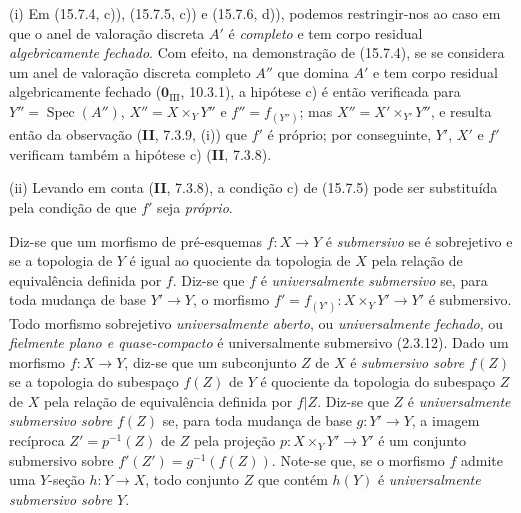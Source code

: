 \begin{remarks}[15.7.7]
\label{IV.15.7.7}
(i) Em (15.7.4, c)), (15.7.5, c)) e (15.7.6, d)), podemos restringir-nos ao caso em que o anel de valoração discreta $A'$ é \emph{completo} e tem corpo residual \emph{algebricamente fechado}. Com efeito, na demonstração de (15.7.4), se se considera um anel de valoração discreta completo $A''$ que domina $A'$ e tem corpo residual algebricamente fechado ($\mathbf{0}_{\mathrm{III}}$, 10.3.1), a hipótese c) é então verificada para $Y''=\operatorname{Spec}(A'')$, $X''=X\times_Y Y''$ e $f''=f_{(Y'')}$; mas $X''=X'\times_{Y'}Y''$, e resulta então da observação (\textbf{II}, 7.3.9, (i)) que $f'$ é próprio; por conseguinte, $Y'$, $X'$ e $f'$ verificam também a hipótese c) (\textbf{II}, 7.3.8).

(ii) Levando em conta (\textbf{II}, 7.3.8), a condição c) de (15.7.5) pode ser substituída pela condição de que $f'$ seja \emph{próprio}.
\end{remarks}

\begin{env}[15.7.8]
\label{IV.15.7.8}
Diz-se que um morfismo de pré-esquemas $f:X\to Y$ é \emph{submersivo} se é sobrejetivo e se a topologia de $Y$ é igual ao quociente da topologia de $X$ pela relação de equivalência definida por $f$. Diz-se que $f$ é \emph{universalmente submersivo} se, para toda mudança de base $Y'\to Y$, o morfismo $f'=f_{(Y')}:X\times_Y Y'\to Y'$ é submersivo. Todo morfismo sobrejetivo \emph{universalmente aberto}, ou \emph{universalmente fechado}, ou \emph{fielmente plano e quase-compacto} é universalmente submersivo (2.3.12). Dado um morfismo $f:X\to Y$, diz-se que um subconjunto $Z$ de $X$ é \emph{submersivo sobre $f(Z)$} se a topologia do subespaço $f(Z)$ de $Y$ é quociente da topologia do subespaço $Z$ de $X$ pela relação de equivalência definida por $f|Z$. Diz-se que $Z$ é \emph{universalmente submersivo sobre $f(Z)$} se, para toda mudança de base $g:Y'\to Y$, a imagem recíproca $Z'=p^{-1}(Z)$ de $Z$ pela projeção $p:X\times_Y Y'\to Y'$ é um conjunto submersivo sobre $f'(Z')=g^{-1}(f(Z))$. Note-se que, se o morfismo $f$ admite uma $Y$-seção $h:Y\to X$, todo conjunto $Z$ que contém $h(Y)$ é \emph{universalmente submersivo sobre $Y$}.
\end{env}

